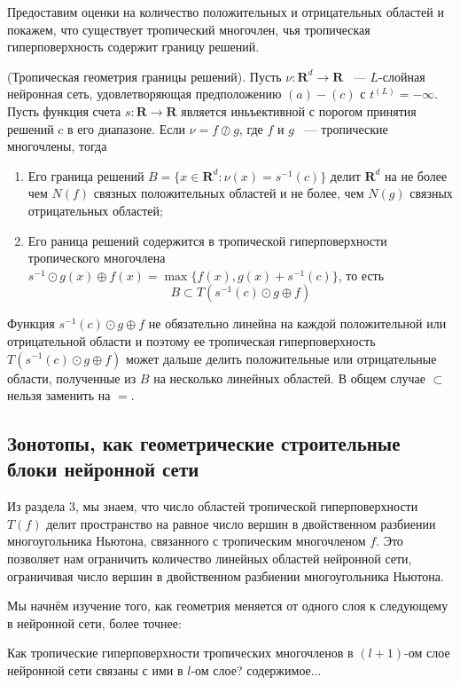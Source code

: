 \documentclass[russian]{lecture-notes}
\begin{document}
	Предоставим оценки на количество положительных и отрицательных областей и покажем, что существует тропический многочлен, чья тропическая гиперповерхность содержит границу решений.
	\begin{Proposition}
		(Тропическая геометрия границы решений). Пусть $\nu : \mathbf{R}^d \rightarrow \mathbf{R}$  ~--- $L$-слойная нейронная сеть, удовлетворяющая предположению $(a)-(c)$ с $t^{(L)} = -\infty$. Пусть функция счета $s : \mathbf{R} \rightarrow \mathbf{R}$  является иньъективной с порогом принятия решений $c$ в его диапазоне. Если $\nu = f \oslash g$, где $f$ и $g$ ~--- тропические многочлены, тогда 
		\begin{enumerate}
			\item Его граница решений $B = \{x \in \mathbf{R}^d:\nu(x) = s^{-1}(c)\}$ делит $\mathbf{R}^d$ на не более чем $N(f)$ связных положительных областей и не более, чем $N(g)$ связных отрицательных областей;
			\item Его раница решений содержится в тропической гиперповерхности тропического многочлена $s^{-1}\odot g(x)\oplus f(x) = \max\{f(x),g(x)+s^{-1}(c)\}$, то есть 
				\[B 
				\subset T(s^{-1}(c)\odot g \oplus f)
				\]  
		\end{enumerate}
	
		Функция $s^{-1}(c) \odot g \oplus f$ не обязательно линейна на каждой положительной или отрицательной области и поэтому ее тропическая гиперповерхность $T(s^{-1}(c)\odot g \oplus f)$ может дальше делить положительные или отрицательные области, полученные из $B$ на несколько линейных областей. В общем случае $\subset$ нельзя заменить на $=$.
	\end{Proposition}

	\subsection{Зонотопы, как геометрические строительные блоки нейронной сети}
	
	Из раздела 3, мы знаем, что число областей тропической гиперповерхности $T(f)$ делит пространство на равное число вершин в двойственном разбиении многоугольника Ньютона, связанного с тропическим многочленом $f$. Это позволяет нам ограничить количество линейных областей нейронной сети, ограничивая число вершин в двойственном разбиении многоугольника Ньютона. 
	
	Мы начнём изучение того, как геометрия меняется от одного слоя к следующему в нейронной сети, более точнее:
	
	\begin{Question}
		Как тропические гиперповерхности тропических многочленов в $(l + 1)$-ом слое нейронной сети связаны с ими в $l$-ом слое?
		содержимое...
	\end{Question}
	
\end{document}
